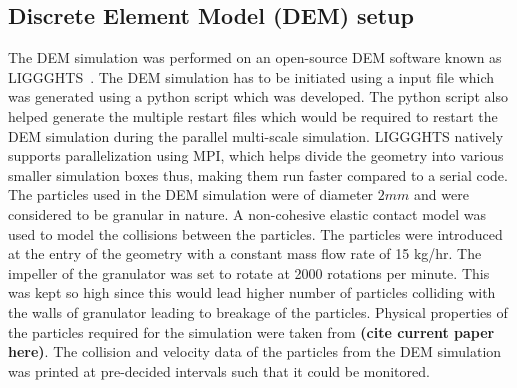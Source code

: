 \documentclass[fleqn,twoside,10pt]{article}
\begin{document}
\subsection{Discrete Element Model (DEM) setup}
The DEM simulation was performed on an open-source DEM software known as 
LIGGGHTS~\citep{kloss2012}.
The DEM simulation has to be initiated using a input file which was generated using a python script 
which was developed. The python script also helped generate the multiple restart files which would 
be required to restart the DEM simulation during the parallel multi-scale simulation. LIGGGHTS 
natively supports parallelization using MPI, which helps divide the geometry into various smaller 
simulation boxes thus, making them run faster compared to a serial code. \\
The particles used in the DEM simulation were of diameter $2mm$ and were considered to be 
granular in nature. A non-cohesive elastic contact model was used to model the collisions between 
the particles. The particles were introduced at the entry of the geometry with a constant mass 
flow rate of 15 kg/hr. The impeller of the granulator was set to rotate at 2000 rotations per 
minute. This was kept so high since this would lead higher number of particles colliding with 
the walls of granulator leading to breakage of the particles. Physical 
properties of the particles 
required for the simulation were taken from \textbf{(cite current paper here)}. The collision and 
velocity data of the particles from the DEM simulation was printed at pre-decided intervals such 
that it could be monitored.

\end{document}

